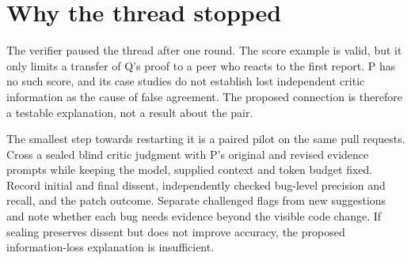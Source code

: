 \documentclass{article}
\begin{document}
\clearpage
\section{Why the thread stopped}

The verifier paused the thread after one round. The score example is valid, but it only limits a
transfer of Q's proof to a peer who reacts to the first report. P has no such score, and its case
studies do not establish lost independent critic information as the cause of false agreement. The
proposed connection is therefore a testable explanation, not a result about the pair.

The smallest step towards restarting it is a paired pilot on the same pull requests. Cross a sealed
blind critic judgment with P's original and revised evidence prompts while keeping the model,
supplied context and token budget fixed. Record initial and final dissent, independently checked
bug-level precision and recall, and the patch outcome. Separate challenged flags from new
suggestions and note whether each bug needs evidence beyond the visible code change. If sealing
preserves dissent but does not improve accuracy, the proposed information-loss explanation is
insufficient.



\end{document}

